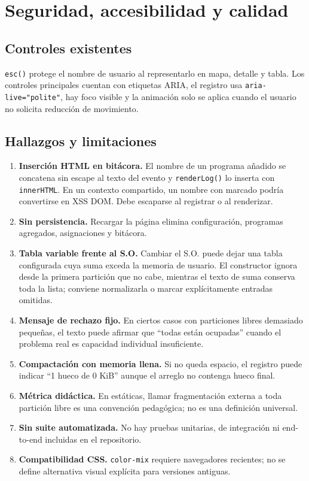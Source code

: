 \documentclass[11pt,a4paper]{article}
\newcommand{\funcion}[1]{\texttt{#1()}}
\begin{document}
\section{Seguridad, accesibilidad y calidad}

\subsection{Controles existentes}

\funcion{esc} protege el nombre de usuario al representarlo en mapa, detalle y
tabla. Los controles principales cuentan con etiquetas ARIA, el registro usa
\texttt{aria-live="polite"}, hay foco visible y la animación solo se aplica cuando
el usuario no solicita reducción de movimiento.

\subsection{Hallazgos y limitaciones}

\begin{enumerate}
  \item \textbf{Inserción HTML en bitácora.} El nombre de un programa añadido se
  concatena sin escape al texto del evento y \funcion{renderLog} lo inserta con
  \texttt{innerHTML}. En un contexto compartido, un nombre con marcado podría
  convertirse en XSS DOM. Debe escaparse al registrar o al renderizar.
  \item \textbf{Sin persistencia.} Recargar la página elimina configuración,
  programas agregados, asignaciones y bitácora.
  \item \textbf{Tabla variable frente al S.O.} Cambiar el S.O. puede dejar una
  tabla configurada cuya suma exceda la memoria de usuario. El constructor ignora
  desde la primera partición que no cabe, mientras el texto de suma conserva toda
  la lista; conviene normalizarla o marcar explícitamente entradas omitidas.
  \item \textbf{Mensaje de rechazo fijo.} En ciertos casos con particiones libres
  demasiado pequeñas, el texto puede afirmar que ``todas están ocupadas'' cuando
  el problema real es capacidad individual insuficiente.
  \item \textbf{Compactación con memoria llena.} Si no queda espacio, el registro
  puede indicar ``1 hueco de 0 KiB'' aunque el arreglo no contenga hueco final.
  \item \textbf{Métrica didáctica.} En estáticas, llamar fragmentación externa a
  toda partición libre es una convención pedagógica; no es una definición universal.
  \item \textbf{Sin suite automatizada.} No hay pruebas unitarias, de integración
  ni end-to-end incluidas en el repositorio.
  \item \textbf{Compatibilidad CSS.} \texttt{color-mix} requiere navegadores
  recientes; no se define alternativa visual explícita para versiones antiguas.
\end{enumerate}
\end{document}
